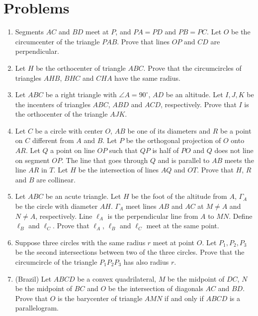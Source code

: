 \documentclass[10pt]{article}
\theoremstyle{definition}
\theoremstyle{remark}
\begin{document}
\section{Problems}
\begin{enumerate}
\item Segments $AC$ and $BD$ meet at $P$, and $PA = PD$ and $PB = PC$. Let $O$ be the circumcenter of the triangle $PAB$. Prove that lines $OP$ and $CD$ are perpendicular.

\item Let $H$ be the orthocenter of triangle $ABC$. Prove that the circumcircles of triangles $AHB$, $BHC$ and $CHA$ have the same radius.

\item Let $ABC$ be a right triangle with $\angle A = 90^\circ$, $AD$ be an altitude. Let $I,J,K$ be the incenters of triangles $ABC$, $ABD$ and $ACD$, respectively. Prove that $I$ is the orthocenter of the triangle $AJK$.

\item Let $C$ be a circle with center $O$, $AB$ be one of its diameters and $R$ be a point on $C$ different from $A$ and $B$. Let $P$ be the orthogonal projection of $O$ onto $AR$. Let $Q$ a point on line $OP$ such that $QP$ is half of $PO$ and $Q$ does not line on segment $OP$. The line that goes through $Q$ and is parallel to $AB$ meets the line $AR$ in $T$. Let $H$ be the intersection of lines $AQ$ and $OT$. Prove that $H$, $R$ and $B$ are collinear.

\item Let $ABC$ be an acute triangle. Let $H$ be the foot of the altitude from $A$, $\Gamma_A$ be the circle with diameter $AH$. $\Gamma_A$ meet lines $AB$ and $AC$ at $M\neq A$ and $N\neq A$, respectively. Line $\ell_A$ is the perpendicular line from $A$ to $MN$. Define $\ell_B$ and $\ell_C$. Prove that $\ell_A$, $\ell_B$ and $\ell_C$ meet at the same point.

\item Suppose three circles with the same radius $r$ meet at point $O$. Let $P_1,P_2,P_3$ be the second intersections between two of the three circles. Prove that the circumcircle of the triangle $P_1P_2P_3$ has also radius $r$.

\item (Brazil) Let $ABCD$ be a convex quadrilateral, $M$ be the midpoint of $DC$, $N$ be the midpoint of $BC$ and $O$ be the intersection of diagonals $AC$ and $BD$. Prove that $O$ is the barycenter of triangle $AMN$ if and only if $ABCD$ is a parallelogram.


\end{enumerate}
\end{document}
